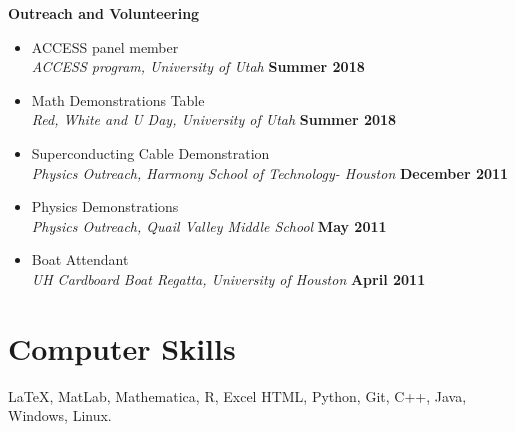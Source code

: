 \documentclass[margin,line]{res}
\begin{document}
\begin{resume}
{\bf Outreach and Volunteering}
\begin{itemize}
    \item[ ] ACCESS panel member 
    \\ {\it ACCESS program, University of Utah} \hfill {\bf Summer 2018}
    \item[ ] Math Demonstrations Table
    \\ {\it Red, White and U Day, University of Utah} \hfill {\bf Summer 2018}
    \item[ ] Superconducting Cable Demonstration
    \\ {\it Physics Outreach, Harmony School of Technology- Houston} \hfill {\bf December 2011}
    \item[ ] Physics Demonstrations
    \\ {\it Physics Outreach, Quail Valley Middle School} \hfill {\bf May 2011}
    \item[ ] Boat Attendant
    \\ {\it UH Cardboard Boat Regatta, University of Houston} \hfill {\bf April 2011}
\end{itemize}



\section{\sc Computer Skills} 
\LaTeX, MatLab, Mathematica, R, Excel HTML, Python, Git, C++, Java, Windows, Linux.


\end{resume}
\end{document}
